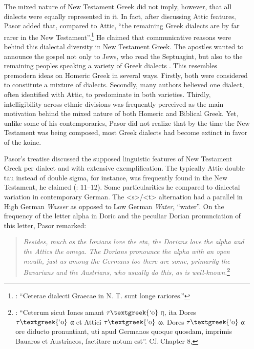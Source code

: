 \documentclass[output=paper]{langsci/langscibook}
\begin{document}
The mixed nature of New Testament Greek did not imply, however, that all dialects were equally represented in it. In fact, after discussing Attic features, Pasor added that, compared to Attic, “the remaining Greek dialects are by far rarer in the New Testament”.\footnote{\citet[24]{Pasor1632}: “Ceterae dialecti Graecae in N. T. sunt longe rariores.”} He claimed that communicative reasons were behind this dialectal diversity in New Testament Greek. The apostles wanted to announce the gospel not only to Jews, who read the Septuagint, but also to the remaining peoples speaking a variety of Greek dialects \citep[143]{Pasor1650}. This resembles premodern ideas on Homeric Greek in several ways. Firstly, both were considered to constitute a mixture of dialects. Secondly, many authors believed one dialect, often identified with Attic, to predominate in both varieties. Thirdly, intelligibility across ethnic divisions was frequently perceived as the main motivation behind the mixed nature of both Homeric and Biblical Greek. Yet, unlike some of his contemporaries, Pasor did not realize that by the time the New Testament was being composed, most Greek dialects had become extinct in favor of the koine.

Pasor’s treatise discussed the supposed linguistic features of New Testament Greek per dialect and with extensive exemplification. The typically Attic double tau instead of double sigma, for instance, was frequently found in the New Testament, he claimed (\citealt{Pasor1632}: 11–12). Some particularities he compared to dialectal variation in contemporary German. The <s>/<t> alternation had a parallel in High German \textit{Wasser} as opposed to Low German \textit{Water}, “water”. On the frequency of the letter alpha in Doric and the peculiar Dorian pronunciation of this letter, Pasor remarked:

\begin{quote}
\emph{\textup{Besides,} \emph{much} \emph{as} \emph{the} \emph{Ionians} \emph{love} \emph{the} \emph{eta,} \emph{the} \emph{Dorians} \emph{love} \emph{the} \emph{alpha} \emph{and} \emph{the} \emph{Attics} \emph{the} \emph{omega.} \emph{The} \emph{Dorians} \emph{pronounce} \emph{the} \emph{alpha} \emph{with} \emph{an} \emph{open} \emph{mouth,} \emph{just} \emph{as} \emph{among} \emph{the} \emph{Germans} \emph{too} \emph{there} \emph{are} \emph{some,} \emph{primarily} \emph{the} \emph{Bavarians} \emph{and} \emph{the} \emph{Austrians,} \emph{who} \emph{usually} \emph{do} \emph{this,} \emph{as} \emph{is} \emph{well-known.}}\footnote{\citet[28]{Pasor1632}: “Ceterum sicut Iones amant $\tau \text{\textgreek{`o}}$ η, ita Dores $\tau \text{\textgreek{`o}}$ α et Attici $\tau \text{\textgreek{`o}}$ ω. Dores $\tau \text{\textgreek{`o}}$ α ore diducto pronuntiant, uti apud Germanos quoque quosdam, imprimis Bauaros et Austriacos, factitare notum est”. Cf. Chapter 8, }
\end{quote}
\end{document}
